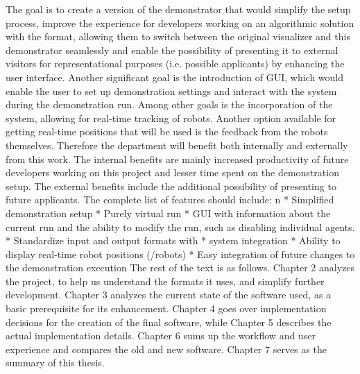 The goal is to create a version of the demonstrator that would simplify the setup process, improve the experience for developers working on an algorithmic solution with the {\mapfIR} format, allowing them to switch between the original visualizer and this demonstrator seamlessly and enable the possibility of presenting it to external visitors for representational purposes (i.e. possible applicants) by enhancing the user interface.\br
Another significant goal is the introduction of GUI, which would enable the user to set up demonstration settings and interact with the system during the demonstration run.
Among other goals is the incorporation of the {\vicon} system, allowing for real-time tracking of robots. Another option available for getting real-time positions that will be used is the feedback from the robots themselves.\br
\br
Therefore the department will benefit both internally and externally from this work. The internal benefits are mainly increased productivity of future developers working on this project and lesser time spent on the demonstration setup. The external benefits include the additional possibility of presenting to future applicants.
The complete list of features should include:
\begitems \style n
    * Simplified demonstration setup
    * Purely virtual run
    * GUI with information about the current run and the ability to modify the run, such as disabling individual agents. 
    * Standardize input and output formats with \mapfIR
    * {\vicon} system integration
    * Ability to display real-time robot positions ({\vicon}/robots)
    * Easy integration of future changes to the demonstration execution
\enditems
\br
The rest of the text is as follows.
{Chapter 2} analyzes the {\mapfIR} project, to help us understand the formats it uses, and simplify further development. Chapter 3 analyzes the current state of the software used, as a basic prerequisite for its enhancement. Chapter 4 goes over implementation decisions for the creation of the final software, while Chapter 5 describes the actual implementation details. Chapter 6 sums up the workflow and user experience and compares the old and new software. Chapter 7 serves as the summary of this thesis.